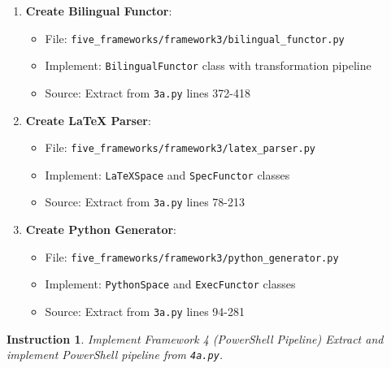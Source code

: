 \documentclass[12pt]{article}
\newtheorem{instruction}{Instruction}
\begin{document}
\begin{enumerate}
    \item \textbf{Create Bilingual Functor}:
    \begin{itemize}
        \item File: \texttt{five\_frameworks/framework3/bilingual\_functor.py}
        \item Implement: \texttt{BilingualFunctor} class with transformation pipeline
        \item Source: Extract from \texttt{3a.py} lines 372-418
    \end{itemize}

    \item \textbf{Create LaTeX Parser}:
    \begin{itemize}
        \item File: \texttt{five\_frameworks/framework3/latex\_parser.py}
        \item Implement: \texttt{LaTeXSpace} and \texttt{SpecFunctor} classes
        \item Source: Extract from \texttt{3a.py} lines 78-213
    \end{itemize}

    \item \textbf{Create Python Generator}:
    \begin{itemize}
        \item File: \texttt{five\_frameworks/framework3/python\_generator.py}
        \item Implement: \texttt{PythonSpace} and \texttt{ExecFunctor} classes
        \item Source: Extract from \texttt{3a.py} lines 94-281
    \end{itemize}
\end{enumerate}

\begin{instruction}{Implement Framework 4 (PowerShell Pipeline)}
Extract and implement PowerShell pipeline from \texttt{4a.py}.
\end{instruction}
\end{document}
